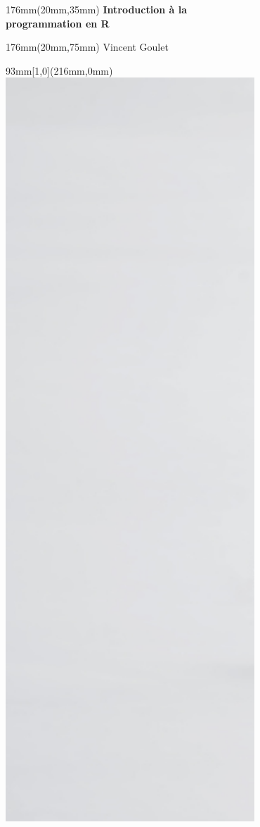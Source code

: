 \documentclass[letterpaper,11pt]{memoir}
\begin{document}
\begin{textblock*}{176mm}(20mm,35mm)
  \sffamily
  \bfseries\fontsize{42}{42}\selectfont
  Introduction à la \\
  programmation en R
\end{textblock*}

\begin{textblock*}{176mm}(20mm,75mm)
  \sffamily
  \fontsize{24}{24}\selectfont
  Vincent Goulet
\end{textblock*}

\mbox{}

\newpage

\begin{textblock*}{93mm}[1,0](216mm,0mm)
  \includegraphics[height=11in,keepaspectratio=true]{harfang-arriere.jpg} \\

\end{textblock*}
\end{document}
